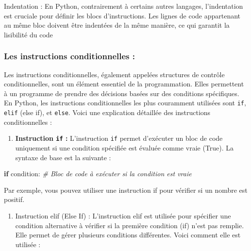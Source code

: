\documentclass[11pt]{article}
\providecommand{\tightlist}{%
      \setlength{\itemsep}{0pt}\setlength{\parskip}{0pt}}
\newenvironment{Shaded}{}{}
\newcommand{\CommentTok}[1]{\textcolor[rgb]{0.38,0.63,0.69}{\textit{{#1}}}}
\newcommand{\NormalTok}[1]{{#1}}
\newcommand{\ControlFlowTok}[1]{\textcolor[rgb]{0.00,0.44,0.13}{\textbf{{#1}}}}
\begin{document}
Indentation : En Python, contrairement à certains autres langages,
l'indentation est cruciale pour définir les blocs d'instructions. Les
lignes de code appartenant au même bloc doivent être indentées de la
même manière, ce qui garantit la lisibilité du code

    \hypertarget{les-instructions-conditionnelles}{%
\subsubsection{Les instructions conditionnelles
:}\label{les-instructions-conditionnelles}}

Les instructions conditionnelles, également appelées structures de
contrôle conditionnelles, sont un élément essentiel de la programmation.
Elles permettent à un programme de prendre des décisions basées sur des
conditions spécifiques. En Python, les instructions conditionnelles les
plus couramment utilisées sont \texttt{if}, \texttt{elif} (else if), et
\texttt{else}. Voici une explication détaillée des instructions
conditionnelles :

\begin{enumerate}
\def\labelenumi{\arabic{enumi}.}
\tightlist
\item
  \textbf{Instruction \texttt{if} :} L'instruction \texttt{if} permet
  d'exécuter un bloc de code uniquement si une condition spécifiée est
  évaluée comme vraie (True). La syntaxe de base est la suivante :
\end{enumerate}

\begin{Shaded}
\begin{Highlighting}[]
   \ControlFlowTok{if}\NormalTok{ condition:}
       \CommentTok{\# Bloc de code à exécuter si la condition est vraie}
\end{Highlighting}
\end{Shaded}

Par exemple, vous pouvez utiliser une instruction if pour vérifier si un
nombre est positif.

\begin{enumerate}
\def\labelenumi{\arabic{enumi}.}
\setcounter{enumi}{1}
\tightlist
\item
  Instruction elif (Else If) : L'instruction elif est utilisée pour
  spécifier une condition alternative à vérifier si la première
  condition (if) n'est pas remplie. Elle permet de gérer plusieurs
  conditions différentes. Voici comment elle est utilisée :
\end{enumerate}
\end{document}
